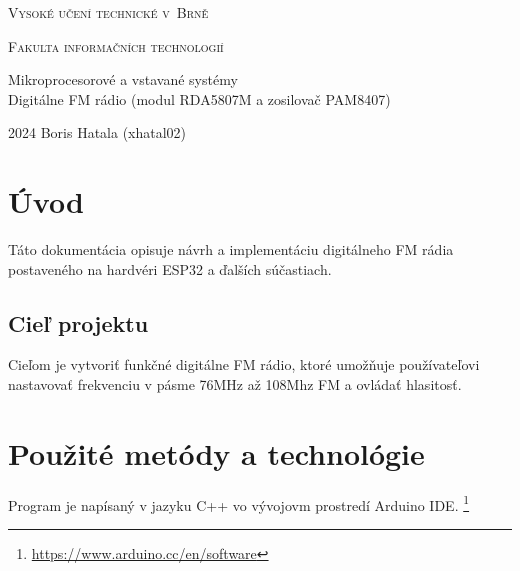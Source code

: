 \documentclass[11pt, a4paper]{article}
\begin{document}
\begin{titlepage}
\thispagestyle{empty}

    \begin{center}

        {\Huge \textsc{Vysoké učení technické v~Brně \\[0.5em]}}

        {\huge \textsc{Fakulta informačních technologií}}


        {\Large Mikroprocesorové a vstavané systémy \\[0.5em]
        \LARGE Digitálne FM rádio (modul RDA5807M a zosilovač PAM8407) 
         }


    \end{center}
{\Large 2024 \hfill Boris Hatala (xhatal02)}

\end{titlepage}

\newpage
\tableofcontents
\newpage


\section{Úvod}
Táto dokumentácia opisuje návrh a implementáciu digitálneho FM rádia postaveného 
na hardvéri ESP32 a ďalších súčastiach.

\subsection{Cieľ projektu}
Cieľom je vytvoriť funkčné digitálne FM rádio, 
ktoré umožňuje používateľovi nastavovať frekvenciu v pásme 76MHz až 108Mhz FM a 
ovládať hlasitosť.

\section{Použité metódy a technológie}
Program je napísaný v jazyku C++ vo vývojovm prostredí Arduino IDE. \footnote{\url{https://www.arduino.cc/en/software}}
\end{document}
